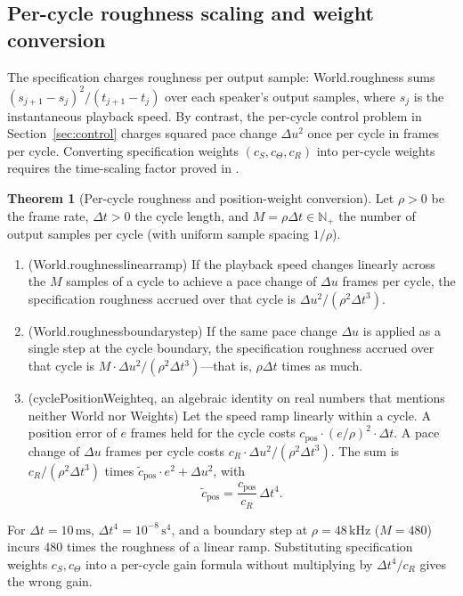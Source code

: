 \documentclass[11pt,a4paper]{article}
\DeclareRobustCommand{\lean}[1]{{\ttfamily\def\_{\textunderscore\allowbreak}#1}}
\theoremstyle{definition}
\newtheorem{theorem}[definition]{Theorem}
\begin{document}
\subsection{Per-cycle roughness scaling and weight conversion}

The specification charges roughness per output sample:
\lean{World.roughness} sums $(s_{j+1} - s_j)^2 / (t_{j+1} - t_j)$ over each
speaker's output samples, where $s_j$ is the instantaneous playback speed. By
contrast, the per-cycle control problem in Section~\ref{sec:control} charges
squared pace change $\Delta u^2$ once per cycle in frames per cycle. Converting
specification weights $(c_S, c_\Theta, c_R)$ into per-cycle weights requires
the time-scaling factor proved in .

\begin{theorem}[Per-cycle roughness and position-weight conversion]
\label{thm:weight-conv}
Let $\rho > 0$ be the frame rate, $\Delta t > 0$ the cycle length, and
$M = \rho\Delta t \in \mathbb{N}_+$ the number of output samples per cycle
(with uniform sample spacing $1/\rho$).
\begin{enumerate}
\item (\lean{World.roughness\_linear\_ramp}) If the playback speed changes
  linearly across the $M$ samples of a cycle to achieve a pace change of
  $\Delta u$ frames per cycle, the specification roughness accrued over that
  cycle is $\Delta u^2 / (\rho^2 \Delta t^3)$.
\item (\lean{World.roughness\_boundary\_step}) If the same pace change
  $\Delta u$ is applied as a single step at the cycle boundary, the
  specification roughness accrued over that cycle is
  $M \cdot \Delta u^2 / (\rho^2 \Delta t^3)$—that is, $\rho\Delta t$ times as
  much.
\item (\lean{cyclePositionWeight\_eq}, an algebraic identity on real numbers
  that mentions neither \lean{World} nor \lean{Weights}) Let the speed ramp
  linearly within a cycle. A position error of $e$ frames held for the cycle
  costs $c_{\mathrm{pos}}\cdot(e / \rho)^2\cdot\Delta t$. A pace change of
  $\Delta u$ frames per cycle costs $c_R\cdot\Delta u^2 / (\rho^2 \Delta t^3)$.
  The sum is $c_R / (\rho^2 \Delta t^3)$ times
  $\tilde c_{\mathrm{pos}}\cdot e^2 + \Delta u^2$, with
  \[
    \tilde c_{\mathrm{pos}} = \frac{c_{\mathrm{pos}}}{c_R}\,\Delta t^4 .
  \]
\end{enumerate}
\end{theorem}

For $\Delta t = 10\,\text{ms}$, $\Delta t^4 = 10^{-8}\,\text{s}^4$, and a
boundary step at $\rho = 48\,\text{kHz}$ ($M = 480$) incurs $480$ times the
roughness of a linear ramp. Substituting specification weights $c_S, c_\Theta$
into a per-cycle gain formula without multiplying by $\Delta t^4 / c_R$ gives
the wrong gain.
\end{document}
